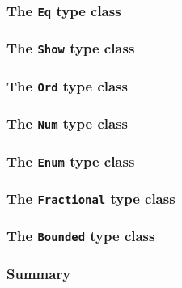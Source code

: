 \documentclass[10pt,pdf,utf8,russian,aspectratio=169]{beamer}
\begin{document}
\begin{frame}
  \frametitle{The \verb"Eq" type class}
\end{frame}

\begin{frame}
  \frametitle{The \verb"Show" type class}
\end{frame}

\begin{frame}
  \frametitle{The \verb"Ord" type class}
\end{frame}

\begin{frame}
  \frametitle{The \verb"Num" type class}
\end{frame}

\begin{frame}
  \frametitle{The \verb"Enum" type class}
\end{frame}

\begin{frame}
  \frametitle{The \verb"Fractional" type class}
\end{frame}

\begin{frame}
  \frametitle{The \verb"Bounded" type class}
\end{frame}

\begin{frame}
  \frametitle{Summary}
\end{frame}
\end{document}
